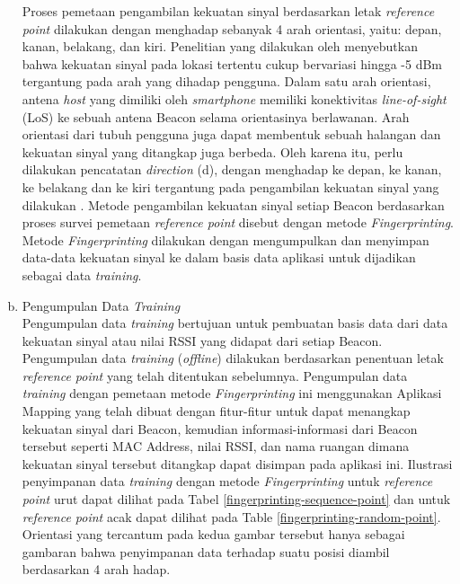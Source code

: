 \begin{enumerate}[a.]
\par Proses pemetaan pengambilan kekuatan sinyal berdasarkan letak \textit{reference point} dilakukan dengan menghadap sebanyak 4 arah orientasi, yaitu: depan, kanan, belakang, dan kiri. Penelitian yang dilakukan oleh \cite{Bahl2000} menyebutkan bahwa kekuatan sinyal pada lokasi tertentu cukup bervariasi hingga -5 dBm tergantung pada arah yang dihadap pengguna. Dalam satu arah orientasi, antena \textit{host} yang dimiliki oleh \textit{smartphone} memiliki konektivitas \textit{line-of-sight} (LoS) ke sebuah antena Beacon selama orientasinya berlawanan. Arah orientasi dari tubuh pengguna juga dapat membentuk sebuah halangan dan kekuatan sinyal yang ditangkap juga berbeda. Oleh karena itu, perlu dilakukan pencatatan \textit{direction} (d), dengan menghadap ke depan, ke kanan, ke belakang dan ke kiri tergantung pada pengambilan kekuatan sinyal yang dilakukan \citep{christ1993}. Metode pengambilan kekuatan sinyal setiap Beacon berdasarkan proses survei pemetaan \textit{reference point} disebut dengan metode \textit{Fingerprinting}. Metode \textit{Fingerprinting} dilakukan dengan mengumpulkan dan menyimpan data-data kekuatan sinyal ke dalam basis data aplikasi untuk dijadikan sebagai data \textit{training}.  

\item Pengumpulan Data \textit{Training}
\\
Pengumpulan data \textit {training} bertujuan untuk pembuatan basis data dari data kekuatan sinyal atau nilai RSSI yang didapat dari setiap Beacon. Pengumpulan data \textit{training} (\textit{offline}) dilakukan berdasarkan penentuan letak \textit{reference point} yang telah ditentukan sebelumnya. Pengumpulan data \textit{training} dengan pemetaan metode \textit{Fingerprinting} ini menggunakan Aplikasi Mapping yang telah dibuat dengan fitur-fitur untuk dapat menangkap kekuatan sinyal dari Beacon, kemudian informasi-informasi dari Beacon tersebut seperti MAC Address, nilai RSSI, dan nama ruangan dimana kekuatan sinyal tersebut ditangkap dapat disimpan pada aplikasi ini. Ilustrasi penyimpanan data \textit{training} dengan metode \textit{Fingerprinting} untuk \textit{reference point} urut dapat dilihat pada Tabel \ref{fingerprinting-sequence-point} dan untuk \textit{reference point} acak dapat dilihat pada Table \ref{fingerprinting-random-point}. Orientasi yang tercantum pada kedua gambar tersebut hanya sebagai gambaran bahwa penyimpanan data terhadap suatu posisi diambil berdasarkan 4 arah hadap.


\end{enumerate}
